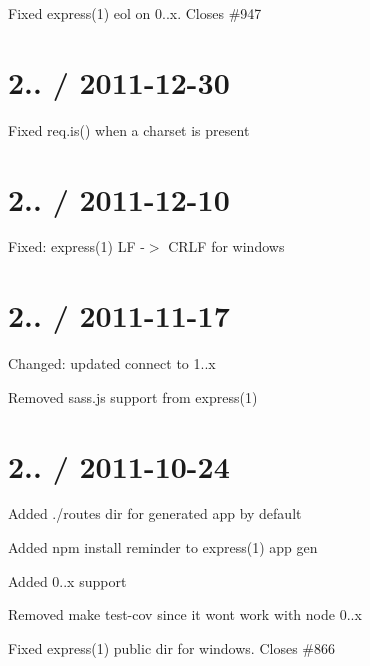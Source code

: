 {\ttfamily 
\begin{DoxyItemize}
\item Fixed {\ttfamily express(1)} eol on 0..\+x. Closes \#947
\end{DoxyItemize}}

{\ttfamily \section*{2.. / 2011-\/12-\/30 }}

{\ttfamily }

{\ttfamily 
\begin{DoxyItemize}
\item Fixed {\ttfamily req.\+is()} when a charset is present
\end{DoxyItemize}}

{\ttfamily \section*{2.. / 2011-\/12-\/10 }}

{\ttfamily }

{\ttfamily 
\begin{DoxyItemize}
\item Fixed\+: express(1) LF -\/$>$ C\+R\+LF for windows
\end{DoxyItemize}}

{\ttfamily \section*{2.. / 2011-\/11-\/17 }}

{\ttfamily }

{\ttfamily 
\begin{DoxyItemize}
\item Changed\+: updated connect to 1..\+x
\item Removed sass.\+js support from express(1)
\end{DoxyItemize}}

{\ttfamily \section*{2.. / 2011-\/10-\/24 }}

{\ttfamily }

{\ttfamily 
\begin{DoxyItemize}
\item Added ./routes dir for generated app by default
\item Added npm install reminder to express(1) app gen
\item Added 0..\+x support
\item Removed {\ttfamily make test-\/cov} since it wont work with node 0..\+x
\item Fixed express(1) public dir for windows. Closes \#866
\end{DoxyItemize}}

